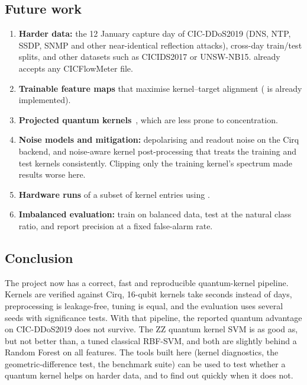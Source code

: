 \subsection{Future work}
\begin{enumerate}
\item \textbf{Harder data:} the 12 January capture day of CIC-DDoS2019 (DNS, NTP, SSDP, SNMP and
      other near-identical reflection attacks), cross-day train/test splits, and other datasets
      such as CICIDS2017 or UNSW-NB15.  already accepts any CICFlowMeter file.
\item \textbf{Trainable feature maps} that maximise kernel--target alignment
      ( is already implemented).
\item \textbf{Projected quantum kernels}~\cite{huang2021}, which are less prone to concentration.
\item \textbf{Noise models and mitigation:} depolarising and readout noise on the Cirq backend,
      and noise-aware kernel post-processing that treats the training and test kernels
      consistently. Clipping only the training kernel's spectrum made results worse here.
\item \textbf{Hardware runs} of a subset of kernel entries using .
\item \textbf{Imbalanced evaluation:} train on balanced data, test at the natural class ratio, and
      report precision at a fixed false-alarm rate.
\end{enumerate}

\subsection{Conclusion}
The project now has a correct, fast and reproducible quantum-kernel pipeline. Kernels are
verified against Cirq, 16-qubit kernels take seconds instead of days, preprocessing is
leakage-free, tuning is equal, and the evaluation uses several seeds with significance tests.
With that pipeline, the reported quantum advantage on CIC-DDoS2019 does not survive. The ZZ
quantum kernel SVM is as good as, but not better than, a tuned classical RBF-SVM, and both are
slightly behind a Random Forest on all features. The tools built here (kernel diagnostics, the
geometric-difference test, the benchmark suite) can be used to test whether a quantum kernel helps
on harder data, and to find out quickly when it does not.
